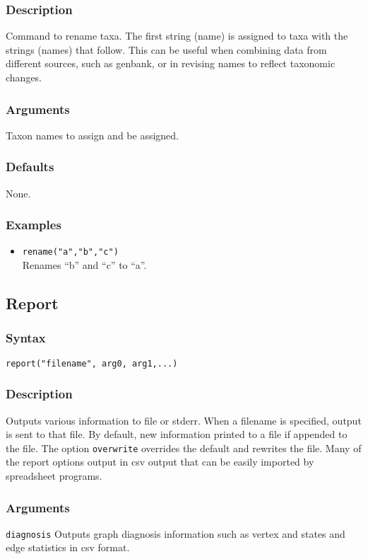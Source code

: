 \documentclass[11pt]{article}
\begin{document}
		\subsubsection{Description}
			Command to rename taxa.  The first string (name) is assigned to taxa with the strings (names) that follow. This can be useful when combining data from
			different sources, such as genbank, or in revising names to reflect taxonomic changes.
		\subsubsection{Arguments}
			Taxon names to assign and be assigned.
		\subsubsection{Defaults}
			None.
		\subsubsection{Examples}
			 \begin{itemize}
			 	\item{\texttt{rename("a","b","c")}\\ Renames ``b'' and ``c'' to ``a''. }
			\end{itemize}
		
	\subsection{Report}
		\subsubsection{Syntax}
				\texttt{report("filename", arg0, arg1,...)}
		\subsubsection{Description}
			Outputs various information to file or stderr.  When a filename is specified, output is sent to that file.  By default, new information printed to a file
			if appended to the file.  The option \texttt{overwrite} overrides the default and rewrites the file.  Many of the report options output in csv output that
			can be easily imported by spreadsheet programs.
		\subsubsection{Arguments}
				\noindent \texttt{diagnosis}  Outputs graph diagnosis information such as vertex and states and edge statistics in csv format. 
				
\end{document}
